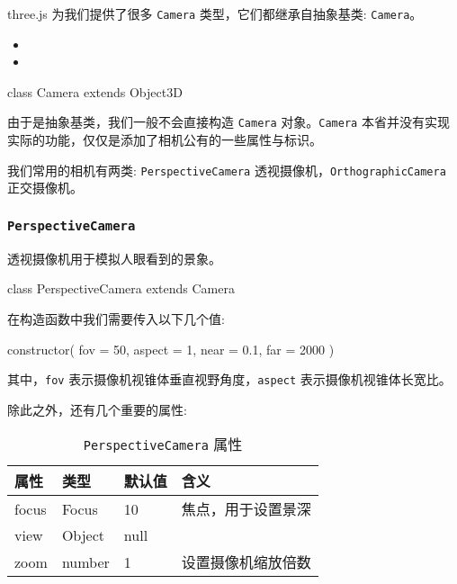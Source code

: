 three.js 为我们提供了很多 \texttt{Camera} 类型，它们都继承自抽象基类: \texttt{Camera}。

\begin{itemize}
  \item {}
  \item {}
\end{itemize}

\begin{JavaScript}
class Camera extends Object3D
\end{JavaScript}

由于是抽象基类，我们一般不会直接构造 \texttt{Camera} 对象。\texttt{Camera} 本省并没有实现实际的功能，仅仅是添加了相机公有的一些属性与标识。

我们常用的相机有两类: \texttt{PerspectiveCamera} 透视摄像机，\texttt{OrthographicCamera} 正交摄像机。

\subsubsection*{\texttt{PerspectiveCamera}}

透视摄像机用于模拟人眼看到的景象。

\begin{JavaScript}
class PerspectiveCamera extends Camera
\end{JavaScript}

在构造函数中我们需要传入以下几个值:

\begin{JavaScript}
constructor( fov = 50, aspect = 1, near = 0.1, far = 2000 )
\end{JavaScript}

其中，\texttt{fov} 表示摄像机视锥体垂直视野角度，\texttt{aspect} 表示摄像机视锥体长宽比。

除此之外，还有几个重要的属性:

\begin{table}[H]
  \centering
  \small
  \caption{\texttt{PerspectiveCamera} 属性}
  \setlength{\tabcolsep}{4mm}
  \begin{tabular}{l|l|l|l}
    \toprule
    \textbf{属性} & \textbf{类型} & \textbf{默认值} & \textbf{含义} \\
    \midrule
    focus & Focus & 10 & 焦点，用于设置景深 \\
    view & Object & null &  \\
    zoom & number & 1 & 设置摄像机缩放倍数 \\
    \bottomrule
  \end{tabular}
\end{table}

